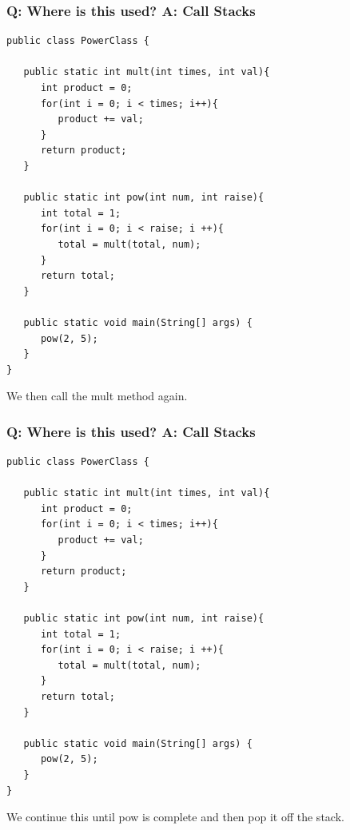 \documentclass{beamer}
\begin{document}
\begin{frame}[fragile]
    \frametitle{Q: Where is this used? A: Call Stacks}
    \begin{minipage}{0.54\textwidth}
    \begin{lstlisting}[frame=trBL, basicstyle=\tiny]
public class PowerClass {
   
   public static int mult(int times, int val){
      int product = 0;
      for(int i = 0; i < times; i++){
         product += val;
      }
      return product;
   }
   
   public static int pow(int num, int raise){
      int total = 1;
      for(int i = 0; i < raise; i ++){
         total = mult(total, num);
      }
      return total;
   }
   
   public static void main(String[] args) {
      pow(2, 5);
   }
}
    \end{lstlisting}
    \end{minipage}
	\hfill
    \begin{minipage}{0.44\textwidth}
        \begin{drawstack}
        \end{drawstack}
    \end{minipage}
    \centering 
    We then call the mult method again.
\end{frame}

\begin{frame}[fragile]
    \frametitle{Q: Where is this used? A: Call Stacks}
    \begin{minipage}{0.54\textwidth}
    \begin{lstlisting}[frame=trBL, basicstyle=\tiny]
public class PowerClass {
   
   public static int mult(int times, int val){
      int product = 0;
      for(int i = 0; i < times; i++){
         product += val;
      }
      return product;
   }
   
   public static int pow(int num, int raise){
      int total = 1;
      for(int i = 0; i < raise; i ++){
         total = mult(total, num);
      }
      return total;
   }
   
   public static void main(String[] args) {
      pow(2, 5);
   }
}
    \end{lstlisting}
    \end{minipage}
	\hfill
    \begin{minipage}{0.44\textwidth}
        \begin{drawstack}
        \end{drawstack}
    \end{minipage}
    \centering 
    We continue this until pow is complete and then pop it off the stack.
\end{frame}
\end{document}
